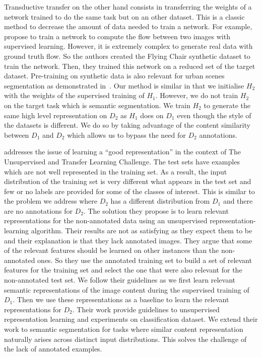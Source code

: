 \documentclass{bmvc2k}
\begin{document}
Transductive transfer on the other hand consists in transferring the weights of a network trained 
to do the same task but on an other dataset. This is a classic method to decrease
the amount of data needed to train a network. For example, \cite{ilg2017flownet} 
propose
to train a network to compute the flow between two images with supervised learning. However, it is
extremely complex to generate real data with ground truth flow. So the authors created the Flying Chair
synthetic dataset to train the network. Then, they trained this network on a reduced 
set of the target dataset. Pre-training on synthetic data is also relevant for 
urban scenes segmentation as demonstrated in~\cite{ros2016synthia}. Our method is similar in that we initialise 
$H_2$ with the weights of the supervised training of $H_1$. However, we do not 
train $H_2$ on the target task which is semantic segmentation. We train $H_2$ 
to generate the same high level representation on $D_2$ as $H_1$ does on $D_1$ 
even though the style of the datasets is different. We do so by taking advantage 
of the content similarity between $D_1$ and $D_2$ which allows us to bypass 
the need for $D_2$ annotations.   

\cite{bengio2012deep} addresses the issue of learning a ``good representation'' in the 
context of The Unsupervised and Transfer Learning Challenge. 
The test sets have examples which are not well represented in the training set.
As a result, the input distribution of the training set is very different what appears in the test set and few or no labels are provided for some of the classes
of interest. This is similar to the problem we address where $D_2$ has a different
distribution from $D_1$ and there are no annotations for $D_2$. The solution they propose
is to learn relevant representations for the non-annotated data using 
an unsupervised representation-learning algorithm. Their results 
are not as satisfying as they expect them to be and their explanation is that they
lack annotated images. They argue that some of the relevant features should be 
learned on other instances than the non-annotated ones. So they use the annotated
training set to build a set of relevant features for the training set and select
the one that were also relevant for the non-annotated test set. 
We follow their guidelines as we first learn relevant semantic representations 
of the image content during the supervised training of $D_1$. Then we use these
representations as a baseline to learn the relevant representations for $D_2$. 
Their work provide guidelines to unsupervised representation learning and 
experiments on classification dataset. We extend their work to semantic segmentation
for tasks where similar content representation naturally arises across distinct
input distributions. This solves the challenge of the lack of annotated 
examples.
\end{document}
